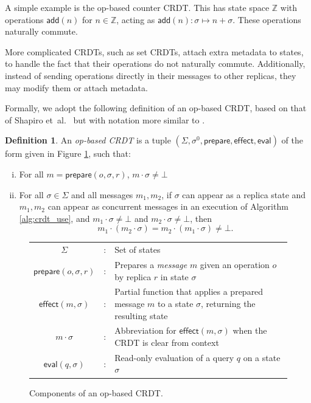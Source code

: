 \documentclass[acmsmall,nonacm,12pt]{acmart}
\newcommand{\mb}[1]{\ensuremath{\mathbb{#1}}}
\newcommand{\msf}[1]{\ensuremath{\mathsf{#1}}}
\newcommand{\Z}{\mb{Z}}
\theoremstyle{plain}
\theoremstyle{definition}
\newtheorem{mydef}[mythm]{Definition}
\begin{document}
A simple example is the op-based counter CRDT.  This has state space $\Z$ with operations $\msf{add}(n)$ for $n \in \Z$, acting as $\msf{add}(n): \sigma \mapsto n + \sigma$.  These operations naturally commute.

More complicated CRDTs, such as set CRDTs, attach extra metadata to states, to handle the fact that their operations do not naturally commute.  Additionally, instead of sending operations directly in their messages to other replicas, they may modify them or attach metadata.

Formally, we adopt the following definition of an op-based CRDT, based on that of Shapiro et~al.\ \cite{crdt_survey_2011} but with notation more similar to \cite[\S 3]{pure_op_based_crdts_extended}.
\begin{mydef}
\label{def:crdt}
An \emph{op-based CRDT} is a tuple $(\Sigma, \sigma^0, \msf{prepare}, \msf{effect}, \msf{eval})$ of the form given in Figure \ref{fig:op-based}, such that:
\begin{enumerate}[(i)]
   \item For all $m = \msf{prepare}(o, \sigma, r)$, $m \cdot \sigma \neq \bot$
   \item For all $\sigma \in \Sigma$ and all messages $m_1, m_2$, if $\sigma$ can appear as a replica state and $m_1, m_2$ can appear as concurrent messages in an execution of Algorithm \ref{alg:crdt_use}, and $m_1 \cdot \sigma \neq \bot$ and $m_2 \cdot \sigma \neq \bot$, then
    \[
    m_1 \cdot (m_2 \cdot \sigma) = m_2 \cdot (m_1 \cdot \sigma) \neq \bot.
    \]
\end{enumerate}
\end{mydef}

\begin{figure}
\begin{tabular}{ccp{4.9cm}}
$\Sigma$ & : & Set of states \\
$\msf{prepare}(o, \sigma, r)$ & : & Prepares a \textit{message} $m$ given an operation $o$ by replica $r$ in state $\sigma$ \\
$\msf{effect}(m, \sigma)$ & : & Partial function that applies a prepared message $m$ to a state $\sigma$, returning the resulting state \\
$m \cdot \sigma$ & : & Abbreviation for $\msf{effect}(m, \sigma)$ when the CRDT is clear from context \\
$\msf{eval}(q, \sigma)$ & : & Read-only evaluation of a query $q$ on a state $\sigma$
\end{tabular}
\caption{Components of an op-based CRDT.}
\label{fig:op-based}
\end{figure}
\end{document}
